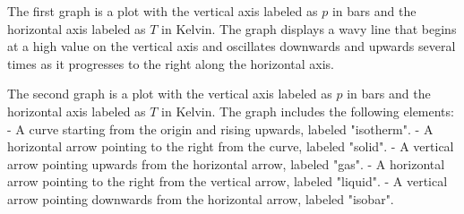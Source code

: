 The first graph is a plot with the vertical axis labeled as \( p \) in bars and the horizontal axis labeled as \( T \) in Kelvin. The graph displays a wavy line that begins at a high value on the vertical axis and oscillates downwards and upwards several times as it progresses to the right along the horizontal axis.

The second graph is a plot with the vertical axis labeled as \( p \) in bars and the horizontal axis labeled as \( T \) in Kelvin. The graph includes the following elements:
- A curve starting from the origin and rising upwards, labeled "isotherm".
- A horizontal arrow pointing to the right from the curve, labeled "solid".
- A vertical arrow pointing upwards from the horizontal arrow, labeled "gas".
- A horizontal arrow pointing to the right from the vertical arrow, labeled "liquid".
- A vertical arrow pointing downwards from the horizontal arrow, labeled "isobar".